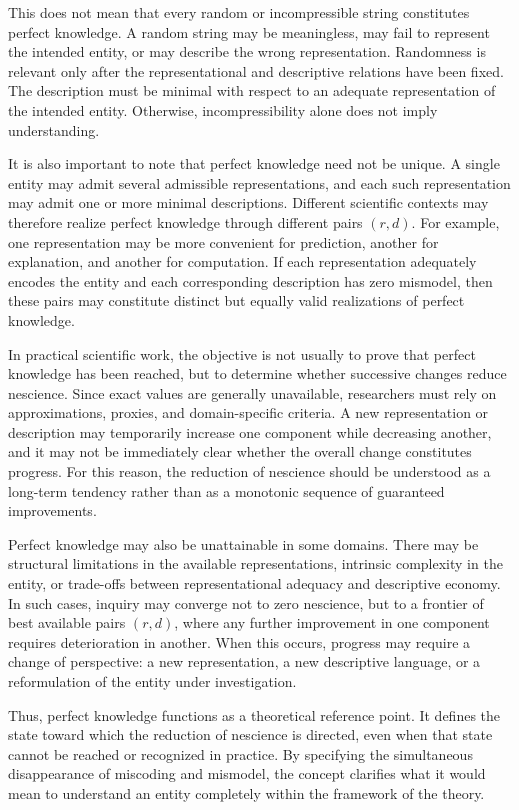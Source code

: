 This does not mean that every random or incompressible string constitutes perfect knowledge. A random string may be meaningless, may fail to represent the intended entity, or may describe the wrong representation. Randomness is relevant only after the representational and descriptive relations have been fixed. The description must be minimal with respect to an adequate representation of the intended entity. Otherwise, incompressibility alone does not imply understanding.

It is also important to note that perfect knowledge need not be unique. A single entity may admit several admissible representations, and each such representation may admit one or more minimal descriptions. Different scientific contexts may therefore realize perfect knowledge through different pairs $(r,d)$. For example, one representation may be more convenient for prediction, another for explanation, and another for computation. If each representation adequately encodes the entity and each corresponding description has zero mismodel, then these pairs may constitute distinct but equally valid realizations of perfect knowledge.

In practical scientific work, the objective is not usually to prove that perfect knowledge has been reached, but to determine whether successive changes reduce nescience. Since exact values are generally unavailable, researchers must rely on approximations, proxies, and domain-specific criteria. A new representation or description may temporarily increase one component while decreasing another, and it may not be immediately clear whether the overall change constitutes progress. For this reason, the reduction of nescience should be understood as a long-term tendency rather than as a monotonic sequence of guaranteed improvements.

Perfect knowledge may also be unattainable in some domains. There may be structural limitations in the available representations, intrinsic complexity in the entity, or trade-offs between representational adequacy and descriptive economy. In such cases, inquiry may converge not to zero nescience, but to a frontier of best available pairs $(r,d)$, where any further improvement in one component requires deterioration in another. When this occurs, progress may require a change of perspective: a new representation, a new descriptive language, or a reformulation of the entity under investigation.

Thus, perfect knowledge functions as a theoretical reference point. It defines the state toward which the reduction of nescience is directed, even when that state cannot be reached or recognized in practice. By specifying the simultaneous disappearance of miscoding and mismodel, the concept clarifies what it would mean to understand an entity completely within the framework of the theory.


